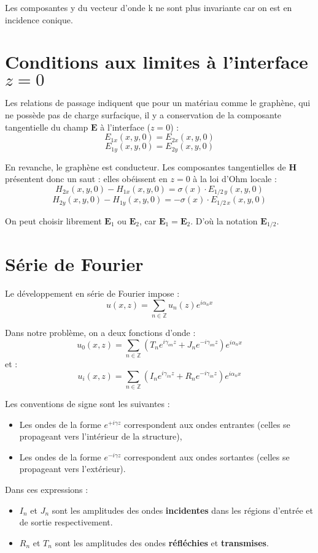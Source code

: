 \documentclass{article}
\begin{document}
Les composantes y du vecteur d'onde k ne sont plus invariante car on est en incidence conique.
\section*{Conditions aux limites à l'interface $z = 0$}

Les relations de passage indiquent que pour un matériau comme le graphène, qui ne possède pas de charge surfacique, il y a conservation de la composante tangentielle du champ $\mathbf{E}$ à l'interface ($z = 0$) :
\[
E_{1x}(x, y, 0) = E_{2x}(x, y, 0)
\]
\[
E_{1y}(x, y, 0) = E_{2y}(x, y, 0)
\]

En revanche, le graphène est conducteur. Les composantes tangentielles de $\mathbf{H}$ présentent donc un saut : elles obéissent en $z = 0$ à la loi d'Ohm locale :
\[
H_{2x}(x, y, 0) - H_{1x}(x, y, 0) = \sigma(x) \cdot E_{1/2\, y}(x, y, 0)
\]
\[
H_{2y}(x, y, 0) - H_{1y}(x, y, 0) = -\sigma(x) \cdot E_{1/2\, x}(x, y, 0)
\]

On peut choisir librement $\mathbf{E}_1$ ou $\mathbf{E}_2$, car $\mathbf{E}_1 = \mathbf{E}_2$. D'où la notation $\mathbf{E}_{1/2}$.

\section*{Série de Fourier}

Le développement en série de Fourier impose :
\[
u(x, z) = \sum_{n \in \mathbb{Z}} u_n(z) e^{i \alpha_n x}
\]

Dans notre problème, on a deux fonctions d'onde :
\[
u_0(x, z) = \sum_{n \in \mathbb{Z}} \left( T_n e^{i \gamma_{on} z} + J_n e^{-i \gamma_{on} z} \right) e^{i \alpha_n x}
\]
et :
\[
u_i(x, z) = \sum_{n \in \mathbb{Z}} \left( I_n e^{i \gamma_{in} z} + R_n e^{-i \gamma_{in} z} \right) e^{i \alpha_n x}
\]

Les conventions de signe sont les suivantes :
\begin{itemize}
  \item Les ondes de la forme \( e^{+i \gamma z} \) correspondent aux ondes entrantes (celles se propageant vers l'intérieur de la structure),
  \item Les ondes de la forme \( e^{-i \gamma z} \) correspondent aux ondes sortantes (celles se propageant vers l'extérieur).
\end{itemize}

\medskip

Dans ces expressions :
\begin{itemize}
  \item \( I_n \) et \( J_n \) sont les amplitudes des ondes \textbf{incidentes} dans les régions d'entrée et de sortie respectivement.
  \item \( R_n \) et \( T_n \) sont les amplitudes des ondes \textbf{réfléchies} et \textbf{transmises}.
\end{itemize}
\end{document}
